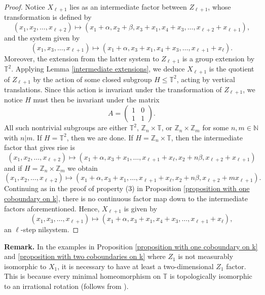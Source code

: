 \documentclass[12pt]{amsart}
\theoremstyle{definition}
\theoremstyle{plain}
\theoremstyle{definition}
\numberwithin{equation}{section}
\begin{document}
\begin{proof}
  Notice $X_{\ell+1}$ lies as an intermediate factor between $Z_{\ell+1}$, whose transformation is defined by $$(x_1,x_2,\dots,x_{\ell+2}) \longmapsto (x_1+\alpha,x_2+\beta,x_3+x_1,x_4+x_3,\dots,x_{\ell+2}+x_{\ell+1}),$$ and the system given by $$(x_1,x_3,\dots,x_{\ell+1})\longmapsto(x_1+\alpha,x_3+x_1,x_4+x_3,\dots,x_{\ell+1}+x_{\ell}).$$ Moreover, the extension from the latter system to $Z_{\ell+1}$ is a group extension by $\mathbb{T}^{2}$. %
  Applying Lemma \ref{intermediate extensions}, we deduce %
  $X_{\ell+1}$ is the quotient of $Z_{\ell+1}$ by the action of some closed subgroup $H \leq \mathbb{T}^{2}$, acting by vertical translations. Since this action is invariant under the transformation of $Z_{\ell+1}$, we notice $H$ must then be invariant under the matrix \[
A=\begin{pmatrix}
1 & 0 \\
1 & 1
\end{pmatrix}.
\]
All such nontrivial subgroups are either $\mathbb{T}^{2}$, $\mathbb{Z}_n \times \mathbb{T}$, or $\mathbb{Z}_n \times \mathbb{Z}_m$ for some $n,m\in \mathbb{N}$ with $n|m.$ If $H=\mathbb{T}^{2}$, then we are done. If $H=\mathbb{Z}_n \times \mathbb{T}$, then the intermediate factor that gives rise is $$(x_1,x_2,\dots,x_{\ell+2}) \mapsto (x_1+\alpha,x_3+x_1,\dots,x_{\ell+1}+x_{\ell},x_2+n\beta,x_{\ell+2}+x_{\ell+1})$$ and if $H=\mathbb{Z}_n \times \mathbb{Z}_m$ we obtain $$(x_1,x_2,\dots,x_{\ell+2}) \mapsto(x_1+\alpha,x_3+x_1,\dots,x_{\ell+1}+x_{\ell},x_2+n\beta,x_{\ell+2}+mx_{\ell+1}).$$ Continuing as in the proof of property (3) in Proposition \ref{proposition with one coboundary on k}, there is no continuous factor map down to the intermediate factors aforementioned. Hence, $X_{\ell+1}$ is given by $$(x_1,x_3,\dots,x_{\ell+1})\longmapsto(x_1+\alpha,x_3+x_1,x_4+x_3,\dots,x_{\ell+1}+x_{\ell}),$$ an $\ell$-step nilsystem. \end{proof}

\noindent\textbf{Remark.}
    In the examples in Proposition \ref{proposition with one coboundary on k} and \ref{proposition with two coboundaries on k} where $Z_1$ is not measurably isomorphic to $X_1$, it is necessary to have at least a two-dimensional $Z_1$ factor. This is because every minimal homeomorphism on $\mathbb{T}$ is topologically isomorphic to an irrational rotation (follows from \cite{Poincare}).
\end{document}
